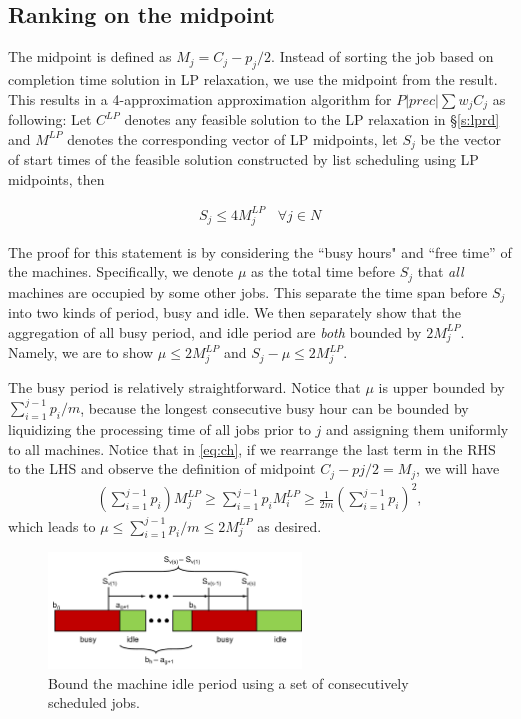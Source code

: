 \subsection{Ranking on the midpoint} \label{s:lpm}
The midpoint is defined as $M_j = C_j - p_j/2$. Instead of sorting the job based on completion time solution in LP relaxation, we use the midpoint from the result. This results in a 4-approximation approximation algorithm for $P|prec|\sum w_jC_j$ as following: Let $C^{LP}$ denotes any feasible solution to the LP relaxation in \S\ref{s:lprd} and $M^{LP}$ denotes the corresponding vector of LP midpoints, let $S_j$ be the vector of start times of the feasible solution constructed by list scheduling using LP midpoints, then

\begin{align}
S_j \leq 4 M^{LP}_j \:\:\:\: \forall j \in N
\end{align}

The proof for this statement is by considering the ``busy hours" and ``free time'' of the machines. Specifically, we denote $\mu$ as the total time before $S_j$ that \emph{all} machines are occupied by some other jobs. This separate the time span before $S_j$ into two kinds of period, busy and idle. We then separately show that the aggregation of all busy period, and idle period are \emph{both} bounded by $2M^{LP}_j$. Namely, we are to show $\mu \leq 2 M^{LP}_j$ and  $S_j - \mu \leq 2 M^{LP}_j$.

The busy period is relatively straightforward. Notice that $\mu$ is upper bounded by $\sum_{i=1}^{j-1} p_i /m$, because the longest consecutive busy hour can be bounded by liquidizing the processing time of all jobs prior to $j$ and assigning them uniformly to all machines. Notice that in \eqref{eq:ch}, if we rearrange the last term in the RHS to the LHS and observe the definition of midpoint $C_j-pj/2 = M_j$, we will have 
\begin{align}
\left(\sum_{i=1}^{j-1}p_i\right)M^{LP}_j \geq \sum_{i=1}^{j-1} p_i M^{LP}_i \geq \frac{1}{2m}\left(\sum_{i=1}^{j-1}p_i\right)^2,
\end{align}
which leads to $\mu \leq \sum_{i=1}^{j-1} p_i /m \leq 2 M^{LP}_j$ as desired. 

\begin{figure}[h]
	\centering
	\includegraphics[width=0.6\textwidth]{figs/4-approx-1.pdf}
	\caption{Bound the machine idle period using a set of consecutively scheduled jobs.}
	\label{fig:4-approx}
\end{figure}

